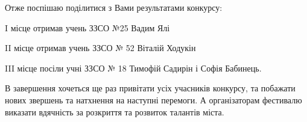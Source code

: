 Отже поспішаю поділитися з Вами результатами конкурсу:

I місце отримав учень ЗЗСО №25 Вадим Ялі 

II місце отримав учень ЗЗСО № 52 Віталій Ходукін 

III місце посіли учні ЗЗСО № 18 Тимофій Садирін і Софія Бабинець.

В завершення хочеться ще раз привітати усіх учасників конкурсу, та побажати
нових звершень та натхнення на наступні перемоги. А організаторам фестивалю
виказати вдячність за розкриття та розвиток талантів міста.
